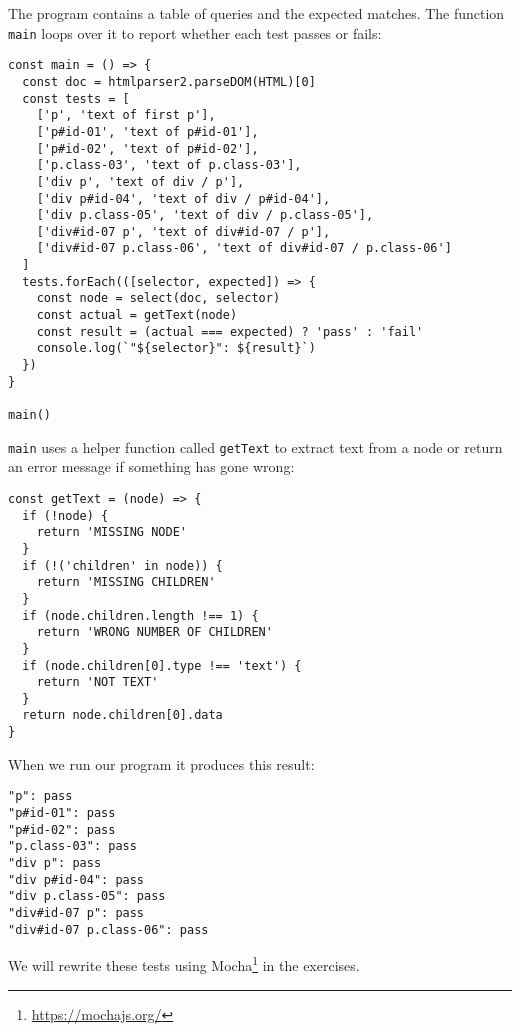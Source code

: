 \documentclass[krantzl]{krantz}
\newcommand{\hreffoot}[2]{{#1}\footnote{\href{#2}{#2}}}
\begin{document}
The program contains a table of queries and the expected matches.
The function \texttt{main} loops over it to report whether each test passes or fails:


\begin{lstlisting}[frame=single,frameround=tttt]
const main = () => {
  const doc = htmlparser2.parseDOM(HTML)[0]
  const tests = [
    ['p', 'text of first p'],
    ['p#id-01', 'text of p#id-01'],
    ['p#id-02', 'text of p#id-02'],
    ['p.class-03', 'text of p.class-03'],
    ['div p', 'text of div / p'],
    ['div p#id-04', 'text of div / p#id-04'],
    ['div p.class-05', 'text of div / p.class-05'],
    ['div#id-07 p', 'text of div#id-07 / p'],
    ['div#id-07 p.class-06', 'text of div#id-07 / p.class-06']
  ]
  tests.forEach(([selector, expected]) => {
    const node = select(doc, selector)
    const actual = getText(node)
    const result = (actual === expected) ? 'pass' : 'fail'
    console.log(`"${selector}": ${result}`)
  })
}

main()
\end{lstlisting}



\noindent \texttt{main} uses a helper function called \texttt{getText} to extract text from a node
or return an error message if something has gone wrong:


\begin{lstlisting}[frame=single,frameround=tttt]
const getText = (node) => {
  if (!node) {
    return 'MISSING NODE'
  }
  if (!('children' in node)) {
    return 'MISSING CHILDREN'
  }
  if (node.children.length !== 1) {
    return 'WRONG NUMBER OF CHILDREN'
  }
  if (node.children[0].type !== 'text') {
    return 'NOT TEXT'
  }
  return node.children[0].data
}
\end{lstlisting}



When we run our program it produces this result:


\begin{lstlisting}[frame=single,frameround=tttt]
"p": pass
"p#id-01": pass
"p#id-02": pass
"p.class-03": pass
"div p": pass
"div p#id-04": pass
"div p.class-05": pass
"div#id-07 p": pass
"div#id-07 p.class-06": pass
\end{lstlisting}



We will rewrite these tests using \hreffoot{Mocha}{https://mochajs.org/} in the exercises.
\end{document}
